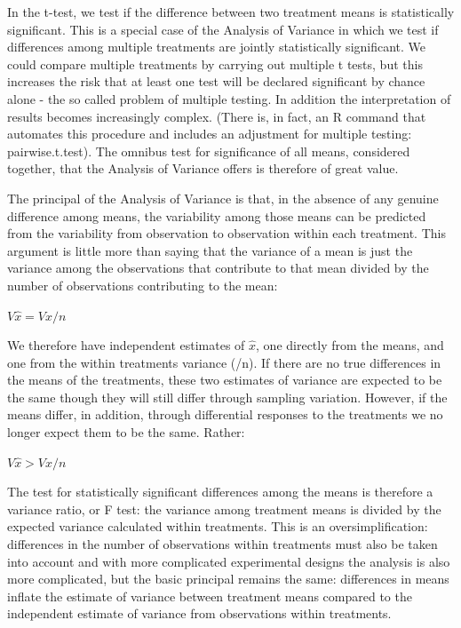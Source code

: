 \documentclass[
]{book}
\begin{document}
In the t-test, we test if the difference between two treatment means is statistically significant. This is a special case of the Analysis of Variance in which we test if differences among multiple treatments are jointly statistically significant. We could compare multiple treatments by carrying out multiple t tests, but this increases the risk that at least one test will be declared significant by chance alone - the so called problem of multiple testing. In addition the interpretation of results becomes increasingly complex. (There is, in fact, an R command that automates this procedure and includes an adjustment for multiple testing: pairwise.t.test). The omnibus test for significance of all means, considered together, that the Analysis of Variance offers is therefore of great value.

The principal of the Analysis of Variance is that, in the absence of any genuine difference among means, the variability among those means can be predicted from the variability from observation to observation within each treatment. This argument is little more than saying that the variance of a mean is just the variance among the observations that contribute to that mean divided by the number of observations contributing to the mean:

\(V\hat{x} = Vx/n\)

We therefore have independent estimates of \(\hat{x}\), one directly from the means, and one from the within treatments variance (/n). If there are no true differences in the means of the treatments, these two estimates of variance are expected to be the same though they will still differ through sampling variation. However, if the means differ, in addition, through differential responses to the treatments we no longer expect them to be the same. Rather:

\(V\hat{x} > Vx/n\)

The test for statistically significant differences among the means is therefore a variance ratio, or F test: the variance among treatment means is divided by the expected variance calculated within treatments. This is an oversimplification: differences in the number of observations within treatments must also be taken into account and with more complicated experimental designs the analysis is also more complicated, but the basic principal remains the same: differences in means inflate the estimate of variance between treatment means compared to the independent estimate of variance from observations within treatments.
\end{document}
